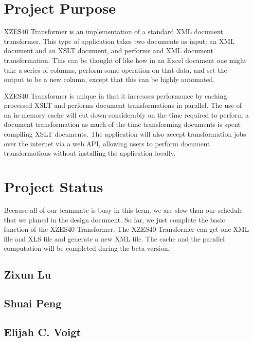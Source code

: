 \section{Project Purpose}

XZES40 Transformer is an implementation of a standard XML document transformer.
This type of application takes two documents as input: an XML document and an XSLT document, and performs and XML document transformation.
This can be thought of like how in an Excel document one might take a series of columns, perform some operation on that data, and set the output to be a new column, except that this can be highly automated.

XZES40 Transformer is unique in that it increases performance by caching processed XSLT and performs document transformations in parallel.
The use of an in-memory cache will cut down considerably on the time required to perform a document transformation as much of the time transforming documents is spent compiling XSLT documents.
The application will also accept transformation jobs over the internet via a web API, allowing users to perform document transformations without installing the application locally.

\section{Project Status}

Because all of our teammate is busy in this term, we are slow than our schedule that we planed in the design document. 
So far, we just complete the basic function of the XZES40-Transformer. The XZES40-Transformer can get one XML file and XLS file and generate a new XML file.
The cache and the parallel computation will be completed during the beta version.  

\subsection{Zixun Lu}

\subsection{Shuai Peng}

\subsection{Elijah C. Voigt}

